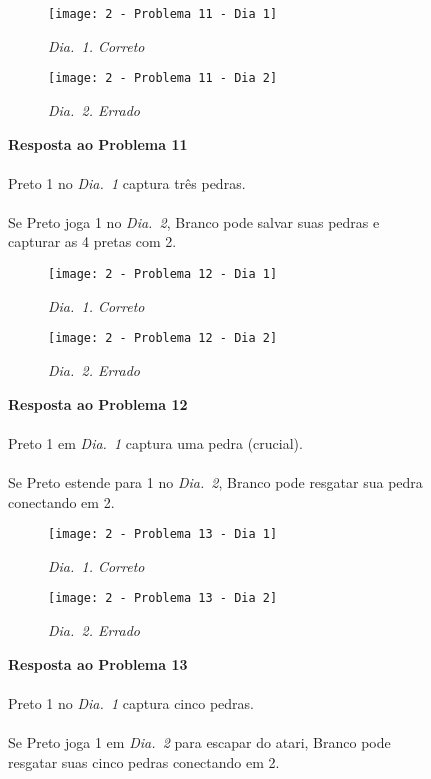 \vfill

\begin{SCfigure}[][h!]
    \begin{subfigure}[t]{.31\textwidth}
        \texttt{[image: 2 - Problema 11 - Dia 1]}
        \caption*{\emph{Dia.\@~1. Correto}}
    \end{subfigure}
    \hfill
    \begin{subfigure}[t]{.31\textwidth}
        \texttt{[image: 2 - Problema 11 - Dia 2]}
        \caption*{\emph{Dia.\@~2. Errado}}
    \end{subfigure}
    \hfill
    \caption*{\textbf{Resposta ao Problema 11}\\\\Preto 1 no \emph{Dia.\@~1} captura três pedras.\\\\Se Preto joga 1 no \emph{Dia.\@~2}, Branco pode salvar suas pedras e capturar as 4 pretas com 2.}
\end{SCfigure}

\vfill

\begin{SCfigure}[][h!]
    \begin{subfigure}[t]{.31\textwidth}
        \texttt{[image: 2 - Problema 12 - Dia 1]}
        \caption*{\emph{Dia.\@~1. Correto}}
    \end{subfigure}
    \hfill
    \begin{subfigure}[t]{.31\textwidth}
        \texttt{[image: 2 - Problema 12 - Dia 2]}
        \caption*{\emph{Dia.\@~2. Errado}}
    \end{subfigure}
    \hfill
    \caption*{\textbf{Resposta ao Problema 12}\\\\Preto 1 em \emph{Dia.\@~1} captura uma pedra (crucial).\\\\Se Preto estende para 1 no \emph{Dia.\@~2}, Branco pode resgatar sua pedra conectando em 2.}
\end{SCfigure}

\pagebreak

\begin{SCfigure}[][h!]
    \begin{subfigure}[t]{.31\textwidth}
        \texttt{[image: 2 - Problema 13 - Dia 1]}
        \caption*{\emph{Dia.\@~1. Correto}}
    \end{subfigure}
    \hfill
    \begin{subfigure}[t]{.31\textwidth}
        \texttt{[image: 2 - Problema 13 - Dia 2]}
        \caption*{\emph{Dia.\@~2. Errado}}
    \end{subfigure}
    \hfill
    \caption*{\textbf{Resposta ao Problema 13}\\\\Preto 1 no \emph{Dia.\@~1} captura cinco pedras.\\\\Se Preto joga 1 em \emph{Dia.\@~2} para escapar do atari, Branco pode resgatar suas cinco pedras conectando em 2.}
\end{SCfigure}

